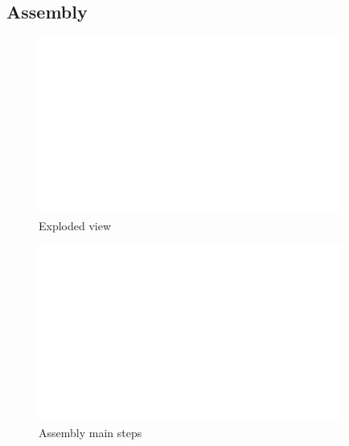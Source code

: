 \subsection{Assembly}
\begin{figure}[h!]\centering \includegraphics[width=10cm,draft]{figures/foo.png}
      \caption{Exploded view}
\end{figure}

\begin{figure}[h!]\centering \includegraphics[width=10cm,draft]{figures/foo.png}
      \caption{Assembly main steps}
\end{figure}




